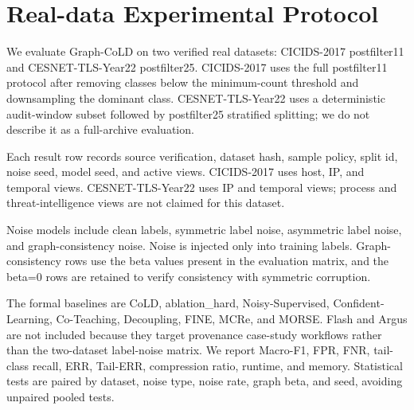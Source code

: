 \section{Real-data Experimental Protocol}
We evaluate Graph-CoLD on two verified real datasets: CICIDS-2017 postfilter11 and CESNET-TLS-Year22 postfilter25. CICIDS-2017 uses the full postfilter11 protocol after removing classes below the minimum-count threshold and downsampling the dominant class. CESNET-TLS-Year22 uses a deterministic audit-window subset followed by postfilter25 stratified splitting; we do not describe it as a full-archive evaluation.

Each result row records source verification, dataset hash, sample policy, split id, noise seed, model seed, and active views. CICIDS-2017 uses host, IP, and temporal views. CESNET-TLS-Year22 uses IP and temporal views; process and threat-intelligence views are not claimed for this dataset.

Noise models include clean labels, symmetric label noise, asymmetric label noise, and graph-consistency noise. Noise is injected only into training labels. Graph-consistency rows use the beta values present in the evaluation matrix, and the beta=0 rows are retained to verify consistency with symmetric corruption.

The formal baselines are CoLD, ablation_hard, Noisy-Supervised, Confident-Learning, Co-Teaching, Decoupling, FINE, MCRe, and MORSE. Flash and Argus are not included because they target provenance case-study workflows rather than the two-dataset label-noise matrix. We report Macro-F1, FPR, FNR, tail-class recall, ERR, Tail-ERR, compression ratio, runtime, and memory. Statistical tests are paired by dataset, noise type, noise rate, graph beta, and seed, avoiding unpaired pooled tests.
